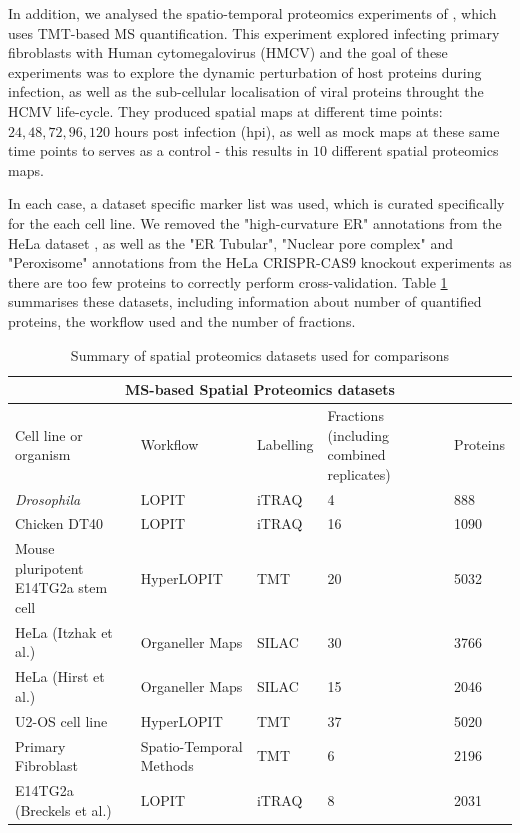 \documentclass[12pt,english]{article}
\begin{document}
In addition, we analysed the spatio-temporal proteomics experiments of \cite{Jean_Beltran:2016},
which uses TMT-based MS quantification. This experiment explored infecting primary fibroblasts with Human cytomegalovirus (HMCV) and the
goal of these experiments was to explore the dynamic perturbation of host proteins during infection, as well as
the sub-cellular localisation of viral proteins throught the HCMV life-cycle. They produced spatial maps
at different time points: $24,48,72,96,120$ hours post infection (hpi), as well as mock
maps at these same time points to serves as a control - this results in $10$ different spatial proteomics
maps.

In each case, a dataset specific marker list was used, which is curated
specifically for the each cell line. We removed the "high-curvature ER" annotations
from the HeLa dataset \citep{Itzhak:2016}, as well as the "ER Tubular", "Nuclear pore complex" and "Peroxisome"
annotations from the HeLa CRISPR-CAS9 knockout experiments \citep{Hirst:2018} as there are too few proteins
to correctly perform cross-validation. Table \ref{table:data} summarises these datasets, including
information about number of quantified proteins, the workflow used and the number of fractions.

\begin{table}[h]
\centering
\begin{tabular}{ |p{3cm}|p{3cm}|p{2cm}|p{2cm}|p{2cm}|  }
 \hline

 \multicolumn{5}{|c|}{MS-based Spatial Proteomics datasets} \\
 \hline
 Cell line or organism & Workflow & Labelling & Fractions (including combined replicates) & Proteins \\
 \hline
 \hline
 \textit{Drosophila}   &  LOPIT & iTRAQ & 4  & 888\\
 \hline
 Chicken DT40 & LOPIT  & iTRAQ & 16 & 1090 \\
 \hline
 Mouse pluripotent E14TG2a stem cell  &  HyperLOPIT & TMT & 20 & 5032\\
 \hline
 HeLa (Itzhak et al.) & Organeller Maps & SILAC & 30 & 3766\\
 \hline
 HeLa (Hirst et al.) & Organeller Maps  & SILAC & 15 & 2046\\
 \hline
 U2-OS cell line & HyperLOPIT  & TMT & 37 & 5020\\
 \hline
 Primary Fibroblast & Spatio-Temporal Methods & TMT & 6 & 2196 \\
 \hline
 E14TG2a (Breckels et al.)  &  LOPIT & iTRAQ & 8 & 2031\\
\hline
\end{tabular}
\caption{Summary of spatial proteomics datasets used for comparisons}
\label{table:data}
\end{table}
\end{document}
